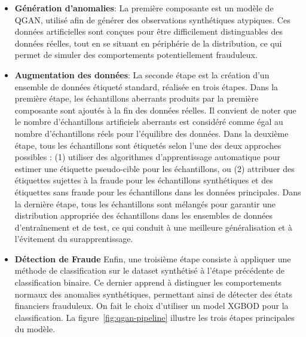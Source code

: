 \documentclass[a4paper]{article}
\begin{document}
\begin{itemize}
    \item{\textbf{Génération d'anomalies}}: La première composante est un modèle de QGAN, utilisé afin de générer des observations synthétiques atypiques. Ces données artificielles sont conçues pour être difficilement distinguables des données réelles, tout en se situant en périphérie de la distribution, ce qui permet de simuler des comportements potentiellement frauduleux.

    \item{\textbf{Augmentation des données}}: La seconde étape est la création d'un ensemble de données étiqueté standard, réalisée en trois étapes. Dans la première étape, les échantillons aberrants produits par la première composante sont ajoutés à la fin des données réelles. Il convient de noter que le nombre d'échantillons artificiels aberrants est considéré comme égal au nombre d'échantillons réels pour l'équilibre des données. Dans la deuxième étape, tous les échantillons sont étiquetés selon l'une des deux approches possibles : (1) utiliser des algorithmes d'apprentissage automatique pour estimer une étiquette pseudo-cible pour les échantillons, ou (2) attribuer des étiquettes sujettes à la fraude pour les échantillons synthétiques et des étiquettes sans fraude pour les échantillons dans les données principales. Dans la dernière étape, tous les échantillons sont mélangés pour garantir une distribution appropriée des échantillons dans les ensembles de données d'entraînement et de test, ce qui conduit à une meilleure généralisation et à l'évitement du surapprentissage.

    \item{\textbf{Détection de Fraude}} Enfin, une troisième étape consiste à appliquer une méthode de classification sur le dataset synthétisé à l'étape précédente de classification binaire. Ce dernier apprend à distinguer les comportements normaux des anomalies synthétiques, permettant ainsi de détecter des états financiers frauduleux. On fait le choix d'utiliser un model XGBOD pour la classification.
    La figure~\ref{fig:qgan-pipeline} illustre les trois étapes principales du modèle. 
    
\end{itemize}
\end{document}
